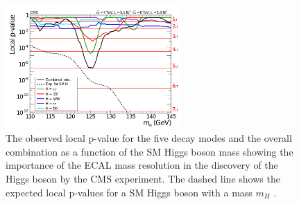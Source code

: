 \begin{figure}
\centering
\includegraphics[width=0.6\textwidth]{figures/lhc_and_cms/higgs_observation_cms.png}
\caption{The observed local p-value for the five decay modes and the overall combination as a function of the SM Higgs boson mass showing the importance of the ECAL mass resolution in the discovery of the Higgs boson by the CMS experiment. The dashed line shows the expected local p-values for a SM Higgs boson with a mass $m_{H}$ \cite{cms_higgs}.}
\label{higgs_observation_cms}
\end{figure}